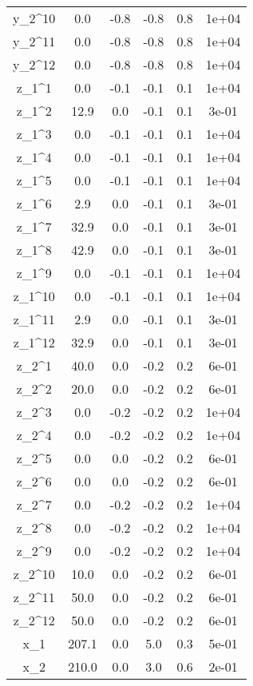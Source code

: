\documentclass[
]{article}
\begin{document}
\begin{longtable}{cccccc}
y\_2\textasciicircum{}10 & 0.0 & -0.8 & -0.8 & 0.8 & 1e+04\\
y\_2\textasciicircum{}11 & 0.0 & -0.8 & -0.8 & 0.8 & 1e+04\\
y\_2\textasciicircum{}12 & 0.0 & -0.8 & -0.8 & 0.8 & 1e+04\\
z\_1\textasciicircum{}1 & 0.0 & -0.1 & -0.1 & 0.1 & 1e+04\\
\addlinespace
z\_1\textasciicircum{}2 & 12.9 & 0.0 & -0.1 & 0.1 & 3e-01\\
z\_1\textasciicircum{}3 & 0.0 & -0.1 & -0.1 & 0.1 & 1e+04\\
z\_1\textasciicircum{}4 & 0.0 & -0.1 & -0.1 & 0.1 & 1e+04\\
z\_1\textasciicircum{}5 & 0.0 & -0.1 & -0.1 & 0.1 & 1e+04\\
z\_1\textasciicircum{}6 & 2.9 & 0.0 & -0.1 & 0.1 & 3e-01\\
\addlinespace
z\_1\textasciicircum{}7 & 32.9 & 0.0 & -0.1 & 0.1 & 3e-01\\
z\_1\textasciicircum{}8 & 42.9 & 0.0 & -0.1 & 0.1 & 3e-01\\
z\_1\textasciicircum{}9 & 0.0 & -0.1 & -0.1 & 0.1 & 1e+04\\
z\_1\textasciicircum{}10 & 0.0 & -0.1 & -0.1 & 0.1 & 1e+04\\
z\_1\textasciicircum{}11 & 2.9 & 0.0 & -0.1 & 0.1 & 3e-01\\
\addlinespace
z\_1\textasciicircum{}12 & 32.9 & 0.0 & -0.1 & 0.1 & 3e-01\\
z\_2\textasciicircum{}1 & 40.0 & 0.0 & -0.2 & 0.2 & 6e-01\\
z\_2\textasciicircum{}2 & 20.0 & 0.0 & -0.2 & 0.2 & 6e-01\\
z\_2\textasciicircum{}3 & 0.0 & -0.2 & -0.2 & 0.2 & 1e+04\\
z\_2\textasciicircum{}4 & 0.0 & -0.2 & -0.2 & 0.2 & 1e+04\\
\addlinespace
z\_2\textasciicircum{}5 & 0.0 & 0.0 & -0.2 & 0.2 & 6e-01\\
z\_2\textasciicircum{}6 & 0.0 & 0.0 & -0.2 & 0.2 & 6e-01\\
z\_2\textasciicircum{}7 & 0.0 & -0.2 & -0.2 & 0.2 & 1e+04\\
z\_2\textasciicircum{}8 & 0.0 & -0.2 & -0.2 & 0.2 & 1e+04\\
z\_2\textasciicircum{}9 & 0.0 & -0.2 & -0.2 & 0.2 & 1e+04\\
\addlinespace
z\_2\textasciicircum{}10 & 10.0 & 0.0 & -0.2 & 0.2 & 6e-01\\
z\_2\textasciicircum{}11 & 50.0 & 0.0 & -0.2 & 0.2 & 6e-01\\
z\_2\textasciicircum{}12 & 50.0 & 0.0 & -0.2 & 0.2 & 6e-01\\
x\_1 & 207.1 & 0.0 & 5.0 & 0.3 & 5e-01\\
x\_2 & 210.0 & 0.0 & 3.0 & 0.6 & 2e-01\\*
\end{longtable}
\endgroup{}
\end{document}
